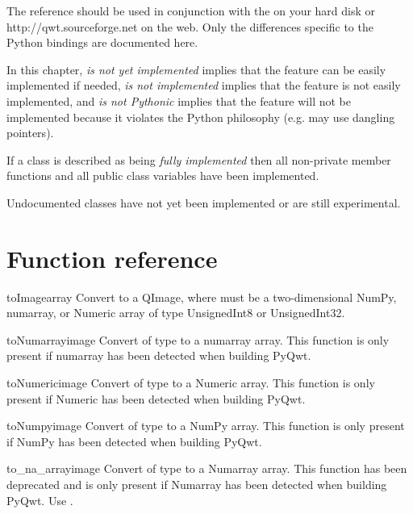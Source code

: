 \documentclass{manual}
\newcommand{\Qwt}{\ulink{Qwt}
  {http://qwt.sourceforge.net}}
\newcommand{\Download}{\ulink{download}
  {http://pyqwt.sourceforge.net/download.html}}
\newcommand{\Future}{
  \begin{notice}[warning]
    The documentation is for the future PyQwt-4.2.2 which is only available
    from CVS. The \Download{} page has links for the latest releases.
  \end{notice}
}
\renewcommand{\Future}{}
\begin{document}
\Future{}

The reference should be used in conjunction with the
 on your hard disk or \Qwt{} on the web.
Only the differences specific to the Python bindings are documented here.

In this chapter, \emph{is not yet implemented} implies that the feature can
be easily implemented if needed, \emph{is not implemented} implies that the
feature is not easily implemented, and \emph{is not Pythonic} implies that
the feature will not be implemented because it violates the Python philosophy
(e.g. may use dangling pointers).

If a class is described as being \emph{fully implemented} then all non-private
member functions and all public class variables have been implemented.

Undocumented classes have not yet been implemented or are still experimental.


\section{Function reference\label{functions}}

\Future{}

\begin{funcdesc}{toImage}{array}
  Convert  to a QImage, where  must be a two-dimensional
  NumPy, numarray, or Numeric array of type UnsignedInt8 or UnsignedInt32.
\end{funcdesc}

\begin{funcdesc}{toNumarray}{image}
  Convert  of type  to a numarray array. This function
  is only present if numarray has been detected when building PyQwt.
\end{funcdesc}

\begin{funcdesc}{toNumeric}{image}
  Convert  of type  to a Numeric array. This function
  is only present if Numeric has been detected when building PyQwt.
\end{funcdesc}

\begin{funcdesc}{toNumpy}{image}
  Convert  of type  to a NumPy array. This function
  is only present if NumPy has been detected when building PyQwt.
\end{funcdesc}

\begin{funcdesc}{to_na_array}{image}
  Convert  of type  to a Numarray array. This function
  has been deprecated and is only present if Numarray has been detected when
  building PyQwt.  Use .
\end{funcdesc}
\end{document}
